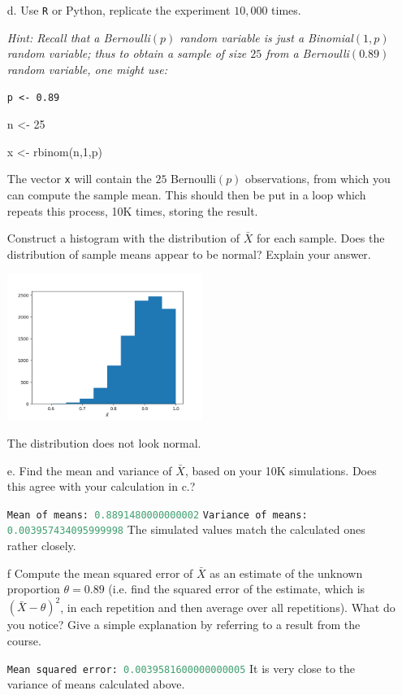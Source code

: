 \documentclass{article}
\newcommand{\1}{\mathbf{1}}
\begin{document}
\begin{itemize}
    \newpage
    \item[d.] Use {\tt R} or Python, replicate the experiment $10,000$ times. \par
    {\it Hint: Recall that a Bernoulli$(p)$ random variable is just a Binomial$(1,p)$ random variable; thus to obtain a sample of size $25$ from a Bernoulli$(0.89)$ random variable, one might use:\par
    {\tt p <- 0.89\par
        n <- 25\par
        x <- rbinom(n,1,p)
    }\par
    The vector {\tt x} will contain the $25$ Bernoulli$(p)$ observations, from which you can compute the sample mean. This should then be put in a loop which repeats this process, 10K times, storing the result.} Construct a histogram with the distribution of $\bar{X}$ for each sample. Does the distribution of sample means appear to be normal? Explain your answer. 
    
    \begin{center}
        \includegraphics[width=0.5\textwidth]{STATS509/HW7/HW7Figures/Problem1.png}
    \end{center}
    
    The distribution does not look normal. 
    
    
    
    
    \item[e.] Find the mean and variance of $\bar{X}$, based on your 10K simulations.  Does this agree with your calculation in c.?

    \lstinline[language=Python]{Mean of means: 0.8891480000000002}\newline
    \lstinline[language=Python]{Variance of means: 0.003957434095999998} \newline
    The simulated values match the calculated ones rather closely.
    

    \item[f] Compute the mean squared error of $\bar{X}$ as an estimate of the unknown proportion $\theta=0.89$ (i.e. find the squared error of the estimate, which is $(\bar{X} - \theta)^2$, in each repetition and then average over all repetitions). What do you notice? Give a simple explanation by referring to a result from the course.
    
    \lstinline[language=Python]{Mean squared error: 0.0039581600000000005} \newline
    It is very close to the variance of means calculated above. 
\end{itemize}
\end{document}
